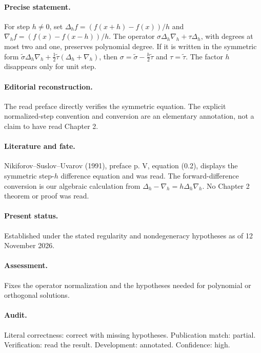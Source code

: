 \paragraph{Precise statement.} For step \(h\ne0\), set \(\Delta_hf=(f(x+h)-f(x))/h\) and \(\nabla_hf=(f(x)-f(x-h))/h\). The operator \(\sigma\Delta_h\nabla_h+\tau\Delta_h\), with degrees at most two and one, preserves polynomial degree. If it is written in the symmetric form \(\widetilde\sigma\Delta_h\nabla_h+\frac12\widetilde\tau(\Delta_h+\nabla_h)\), then \(\sigma=\widetilde\sigma-\frac h2\widetilde\tau\) and \(\tau=\widetilde\tau\). The factor \(h\) disappears only for unit step.

\paragraph{Editorial reconstruction.} The read preface directly verifies the symmetric equation. The explicit normalized-step convention and conversion are an elementary annotation, not a claim to have read Chapter 2.

\paragraph{Literature and fate.} Nikiforov–Suslov–Uvarov (1991), preface p. V, equation (0.2), displays the symmetric step-\(h\) difference equation and was read. The forward-difference conversion is our algebraic calculation from \(\Delta_h-\nabla_h=h\Delta_h\nabla_h\). No Chapter 2 theorem or proof was read.

\paragraph{Present status.} Established under the stated regularity and nondegeneracy hypotheses as of 12 November 2026.

\paragraph{Assessment.} Fixes the operator normalization and the hypotheses needed for polynomial or orthogonal solutions.

\paragraph{Audit.} Literal correctness: correct with missing hypotheses. Publication match: partial. Verification: read the result. Development: annotated. Confidence: high.


